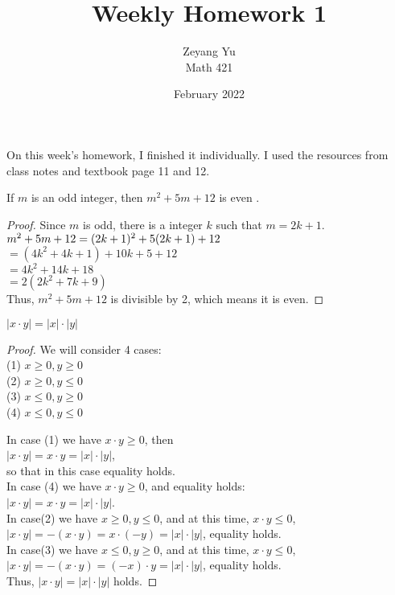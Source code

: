 \documentclass[12pt]{article}
\newenvironment{theorem}[2][Theorem]{\begin{trivlist}
\item[\hskip \labelsep {\bfseries #1}\hskip \labelsep {\bfseries #2.}]}{\end{trivlist}}
\begin{document}
\title{Weekly Homework 1}
\author{Zeyang Yu\\
Math 421}
\date{February 2022}

\maketitle

\noindent On this week's homework, I finished it individually. I used the resources from class notes and textbook page 11 and 12. 

\begin{theorem}{1} 
If $m$ is an odd integer, then $m^2 + 5m + 12$ is even .
\end{theorem}

\begin{proof}
Since $m$ is odd, there is a integer $k$ such that $m = 2k + 1$.
\\$ m^2 + 5m + 12 
\\= (2k + 1)^2 + 5(2k + 1) + 12$
\\$=(4k^2 + 4k + 1) + 10k + 5 + 12$
\\$=4k^2 + 14k + 18$
\\$=2(2k^2 + 7k + 9)$
\\Thus, $m^2 + 5m + 12$ is divisible by 2, which means it is even. 
\end{proof}

\begin{theorem}{2} 
$|x \cdot y| = |x| \cdot |y|$
\end{theorem}
\begin{proof}
We will consider 4 cases:
\\(1) $x \geq 0, y \geq 0$
\\(2) $x \geq 0, y \leq 0$
\\(3) $x \leq 0, y \geq 0$
\\(4) $x \leq 0, y \leq 0$

In case (1) we have $x \cdot y \geq 0 $, then
\\$|x \cdot y| = x \cdot y = |x| \cdot |y|$,
\\so that in this case equality holds. 
\\In case (4) we have $x \cdot y \geq 0 $, and equality holds:
\\$|x \cdot y| = x \cdot y = |x| \cdot |y|$.
\\In case(2) we have $x \geq 0, y \leq 0$, and at this time, $x \cdot y \leq 0 $,
\\$|x \cdot y| = -(x \cdot y) = x \cdot (-y) = |x| \cdot |y|$, equality holds.
\\In case(3) we have $x \leq 0, y \geq 0$, and at this time, $x \cdot y \leq 0 $,
\\$|x \cdot y| = -(x \cdot y) = (-x) \cdot y = |x| \cdot |y|$, equality holds.
\\Thus, $|x \cdot y| = |x| \cdot |y|$ holds.
\end{proof}
\end{document}
